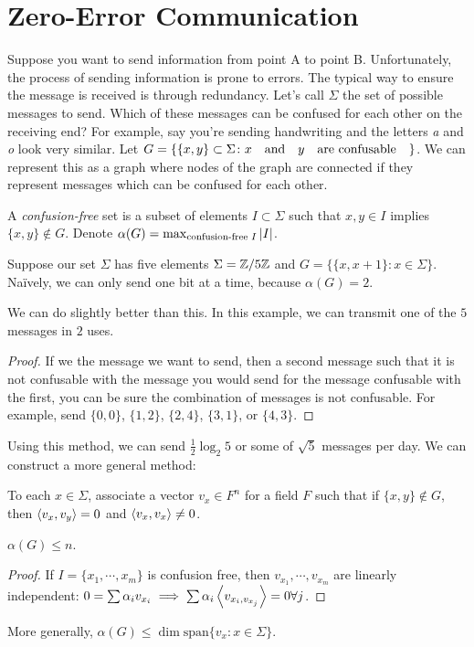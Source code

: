 \documentclass[a4paper,twoside,master.tex]{subfiles}
\begin{document}
\section{Zero-Error Communication}\label{sec:zero-error_communication}

Suppose you want to send information from point A to point B. Unfortunately, the process of sending information is prone to errors. The typical way to ensure the message is received is through redundancy. Let's call $ \Sigma $ the set of possible messages to send. Which of these messages can be confused for each other on the receiving end? For example, say you're sending handwriting and the letters \textit{a} and \textit{o} look very similar. Let $ G = \{ \{x,y\} \subset \Sigma \colon x \qand y \qq{are confusable}\} $. We can represent this as a graph where nodes of the graph are connected if they represent messages which can be confused for each other.

A \textit{confusion-free} set is a subset of elements $ I\subset \Sigma $ such that $ x,y \in I $ implies $ \{x,y\} \notin G $. Denote $ \alpha(G) = \max_{\text{confusion-free } I} \abs{I} $.

Suppose our set $ \Sigma $ has five elements $ \Sigma = \mathbb{Z}/5\mathbb{Z} $ and $ G = \{ \{x, x+1\} \colon x \in \Sigma \} $. Na\"ively, we can only send one bit at a time, because $ \alpha(G) = 2 $.

\begin{claim}
    We can do slightly better than this. In this example, we can transmit one of the $ 5 $ messages in $ 2 $ uses. 
\end{claim}
\begin{proof}
    If we the message we want to send, then a second message such that it is not confusable with the message you would send for the message confusable with the first, you can be sure the combination of messages is not confusable. For example, send $ \{0,0\} $, $ \{1,2\} $, $ \{2,4\} $, $ \{3,1\} $, or $ \{4,3\} $.
\end{proof}
Using this method, we can send $ \frac{1}{2} \log_2{5} $ or some of $ \sqrt{5} $ messages per day. We can construct a more general method:

To each $ x \in \Sigma $, associate a vector $ v_x \in F^n $ for a field $ F $ such that if $ \{x, y\} \notin G $, then $ \ev{v_x, v_y} = 0 $ and $ \ev{v_x, v_x} \neq 0 $.
\begin{claim}
    $ \alpha(G) \leq n $.
\end{claim}
\begin{proof}
    If $ I = \{x_1, \cdots, x_m\} $ is confusion free, then $ v_{x_1}, \cdots, v_{x_m} $ are linearly independent: $ 0 = \sum \alpha_i v_{x_i} \implies \sum \alpha_i \ev{v_{x_i, v_{x_j}}} = 0 \forall j$.
\end{proof}
More generally, $ \alpha(G) \leq \dim \text{span} \{v_x\colon x \in \Sigma\} $.
\end{document}
